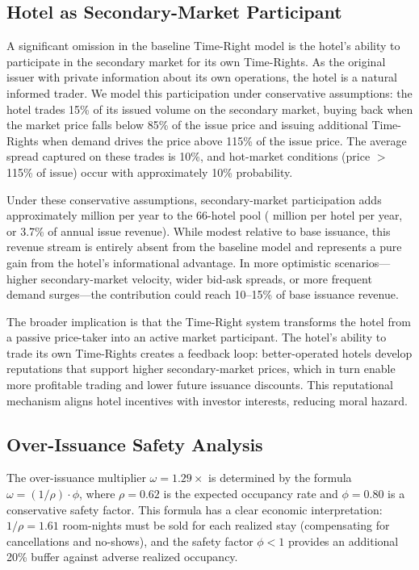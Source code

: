 \documentclass[12pt,a4paper]{article}
\begin{document}
\subsection{Hotel as Secondary-Market Participant}

A significant omission in the baseline Time-Right model is the hotel's ability to participate in the secondary market for its own Time-Rights.
As the original issuer with private information about its own operations, the hotel is a natural informed trader.
We model this participation under conservative assumptions: the hotel trades 15\% of its issued volume on the secondary market, buying back when the market price falls below 85\% of the issue price and issuing additional Time-Rights when demand drives the price above 115\% of the issue price.
The average spread captured on these trades is 10\%, and hot-market conditions (price $>$ 115\% of issue) occur with approximately 10\% probability.

Under these conservative assumptions, secondary-market participation adds approximately  million per year to the 66-hotel pool ( million per hotel per year, or 3.7\% of annual issue revenue).
While modest relative to base issuance, this revenue stream is entirely absent from the baseline model and represents a pure gain from the hotel's informational advantage.
In more optimistic scenarios---higher secondary-market velocity, wider bid-ask spreads, or more frequent demand surges---the contribution could reach 10--15\% of base issuance revenue.

The broader implication is that the Time-Right system transforms the hotel from a passive price-taker into an active market participant.
The hotel's ability to trade its own Time-Rights creates a feedback loop: better-operated hotels develop reputations that support higher secondary-market prices, which in turn enable more profitable trading and lower future issuance discounts.
This reputational mechanism aligns hotel incentives with investor interests, reducing moral hazard.

\subsection{Over-Issuance Safety Analysis}

The over-issuance multiplier $\omega = 1.29\times$ is determined by the formula $\omega = (1 / \rho) \cdot \phi$, where $\rho = 0.62$ is the expected occupancy rate and $\phi = 0.80$ is a conservative safety factor.
This formula has a clear economic interpretation: $1/\rho = 1.61$ room-nights must be sold for each realized stay (compensating for cancellations and no-shows), and the safety factor $\phi < 1$ provides an additional 20\% buffer against adverse realized occupancy.
\end{document}

